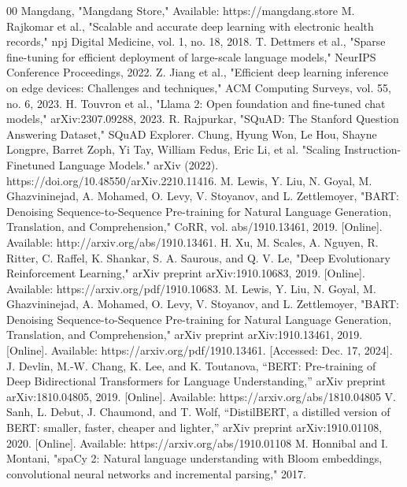 \documentclass[conference]{IEEEtran}
\begin{document}
\begin{thebibliography}{00}
 Mangdang, "Mangdang Store," Available: https://mangdang.store
 M. Rajkomar et al., "Scalable and accurate deep learning with electronic health records," npj Digital Medicine, vol. 1, no. 18, 2018.
 T. Dettmers et al., "Sparse fine-tuning for efficient deployment of large-scale language models," NeurIPS Conference Proceedings, 2022.
 Z. Jiang et al., "Efficient deep learning inference on edge devices: Challenges and techniques," ACM Computing Surveys, vol. 55, no. 6, 2023.
 H. Touvron et al., "Llama 2: Open foundation and fine-tuned chat models," arXiv:2307.09288, 2023.
 R. Rajpurkar, "SQuAD: The Stanford Question Answering Dataset," SQuAD Explorer.
 Chung, Hyung Won, Le Hou, Shayne Longpre, Barret Zoph, Yi Tay, William Fedus, Eric Li, et al. "Scaling Instruction-Finetuned Language Models." arXiv (2022). https://doi.org/10.48550/arXiv.2210.11416.
 M. Lewis, Y. Liu, N. Goyal, M. Ghazvininejad, A. Mohamed, O. Levy, V. Stoyanov, and L. Zettlemoyer, "BART: Denoising Sequence-to-Sequence Pre-training for Natural Language Generation, Translation, and Comprehension," CoRR, vol. abs/1910.13461, 2019. [Online]. Available: http://arxiv.org/abs/1910.13461.
 H. Xu, M. Scales, A. Nguyen, R. Ritter, C. Raffel, K. Shankar, S. A. Saurous, and Q. V. Le, "Deep Evolutionary Reinforcement Learning," arXiv preprint arXiv:1910.10683, 2019. [Online]. Available: https://arxiv.org/pdf/1910.10683.
 M. Lewis, Y. Liu, N. Goyal, M. Ghazvininejad, A. Mohamed, O. Levy, V. Stoyanov, and L. Zettlemoyer, "BART: Denoising Sequence-to-Sequence Pre-training for Natural Language Generation, Translation, and Comprehension," arXiv preprint arXiv:1910.13461, 2019. [Online]. Available: https://arxiv.org/pdf/1910.13461. [Accessed: Dec. 17, 2024].
 J. Devlin, M.-W. Chang, K. Lee, and K. Toutanova, “BERT: Pre-training of Deep Bidirectional Transformers for Language Understanding,” arXiv preprint arXiv:1810.04805, 2019. [Online]. Available: https://arxiv.org/abs/1810.04805
 V. Sanh, L. Debut, J. Chaumond, and T. Wolf, “DistilBERT, a distilled version of BERT: smaller, faster, cheaper and lighter,” arXiv preprint arXiv:1910.01108, 2020. [Online]. Available: https://arxiv.org/abs/1910.01108
 M. Honnibal and I. Montani, "spaCy 2: Natural language understanding with Bloom embeddings, convolutional neural networks and incremental parsing," 2017.

\end{thebibliography}
\end{document}
